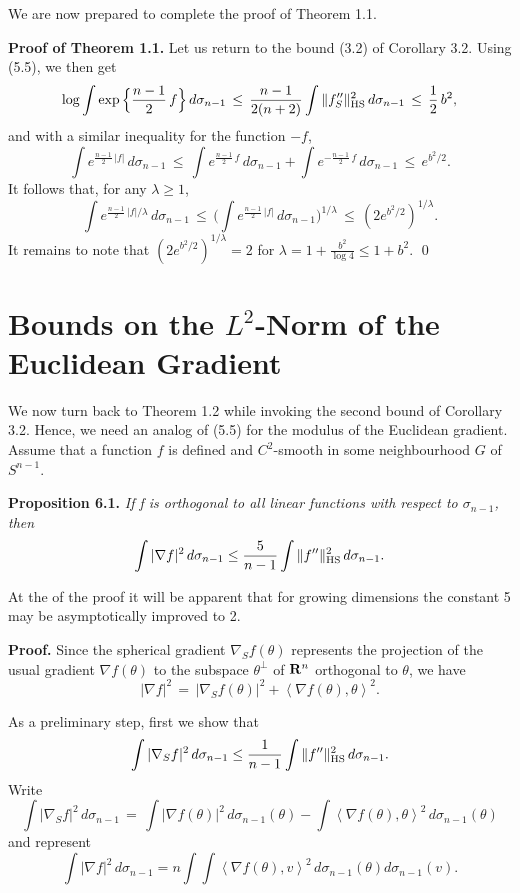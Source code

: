 \documentclass[reqno,12pt]{amsart}
\theoremstyle{plain}
\begin{document}
\vskip5mm
We are now prepared to complete the proof of Theorem 1.1.

\vskip5mm
{\bf Proof of Theorem 1.1.}
Let us return to the bound (3.2) of Corollary 3.2. Using (5.5), we then
get
$$
\log
\int \exp\Big\{\frac{n-1}{2}\, f\Big\}\,d\sigma_{n-1} \, \leq \, 
\frac{n-1}{2(n+2)} \int  \|f''_S\|_{{\rm HS}}^2\,d\sigma_{n-1} \, \leq \,
\frac{1}{2}\,b^2,
$$
and with a similar inequality for the function $-f$,
$$
\int e^{\frac{n-1}{2}\, |f|}\,d\sigma_{n-1} \, \leq \,
\int e^{\frac{n-1}{2}\, f}\,d\sigma_{n-1} +
\int e^{-\frac{n-1}{2}\,f}\,d\sigma_{n-1} \, \leq \, e^{b^2/2}.
$$
It follows that, for any $\lambda \geq 1$,
$$
\int e^{\frac{n-1}{2}\, |f|/\lambda}\,d\sigma_{n-1}
 \, \leq \,
\Big(\int e^{\frac{n-1}{2}\, |f|}\,d\sigma_{n-1}\Big)^{1/\lambda} \, \leq \, 
 (2e^{b^2/2})^{1/\lambda}.
$$
It remains to note that $(2e^{b^2/2})^{1/\lambda} = 2$ for 
$\lambda = 1 + \frac{b^2}{\log 4} \leq 1+b^2$.
\qed

\vskip10mm
\section{{\bf Bounds on the $L^2$-Norm of the Euclidean Gradient}}
\setcounter{equation}{0}

\vskip2mm
\noindent
We now turn back to Theorem 1.2 while invoking the second 
bound of Corollary 3.2. Hence, we need an analog of (5.5) for the modulus
of the Euclidean gradient. Assume that a function $f$ is defined and 
$C^2$-smooth in some neighbourhood $G$ of $S^{n-1}$.

\vskip5mm
{\bf Proposition 6.1.} {\it If f is orthogonal to all 
linear functions with respect to $\sigma_{n-1}$, then
\begin{equation}
\int |\nabla f|^2\,d\sigma_{n-1} \leq \frac{5}{n-1}
\int \|f''\|_{\rm HS}^2\,d\sigma_{n-1}.
\end{equation}
}

\vskip2mm
At the of the proof it will be apparent that for growing dimensions
the constant 5 may be asymptotically improved to 2.

\vskip5mm
{\bf Proof.} Since the spherical gradient $\nabla_S f(\theta)$ represents
the projection of the usual gradient $\nabla f(\theta)$ to the subspace
$\theta^\perp$ of ${{\bf R}}^n$ orthogonal to $\theta$, we have
$$
|\nabla f|^2 \, = \, |\nabla_S f(\theta)|^2 + 
\left<\nabla f(\theta),\theta\right>^2.
$$

As a preliminary step, first we show that
\begin{equation}
\int |\nabla_S f|^2\,d\sigma_{n-1} \leq \frac{1}{n-1}
\int \|f''\|_{\rm HS}^2\,d\sigma_{n-1}.
\end{equation}
Write
\begin{equation}
\int |\nabla_S f|^2\,d\sigma_{n-1} \, = \,
\int |\nabla f(\theta)|^2\,d\sigma_{n-1}(\theta) - 
\int\left<\nabla f(\theta),\theta\right>^2\,d\sigma_{n-1}(\theta)
\end{equation}
and represent
\begin{equation}
\int |\nabla f|^2\,d\sigma_{n-1} = n
\int\!\!\!\int \left<\nabla f(\theta),v\right>^2\,d\sigma_{n-1}(\theta)
d\sigma_{n-1}(v).
\end{equation}
\end{document}
